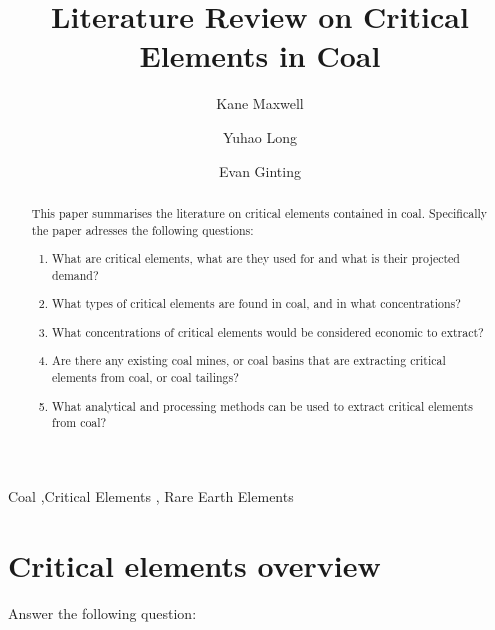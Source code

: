 \documentclass[preprint, 3p,
authoryear]{elsarticle} %
\begin{document}
\begin{frontmatter}

  \title{Literature Review on Critical Elements in Coal}
    \author[Matrix Geoscience]{Kane Maxwell%
  }
    \author[Monash University]{Yuhao Long%
  }
    \author[Monash University]{Evan Ginting%
  }
  
  \begin{abstract}
  This paper summarises the literature on critical elements contained in
  coal. Specifically the paper adresses the following questions:

  \begin{enumerate}
  \def\labelenumi{\arabic{enumi})}
  \item
    What are critical elements, what are they used for and what is their
    projected demand?
  \item
    What types of critical elements are found in coal, and in what
    concentrations?
  \item
    What concentrations of critical elements would be considered
    economic to extract?
  \item
    Are there any existing coal mines, or coal basins that are
    extracting critical elements from coal, or coal tailings?
  \item
    What analytical and processing methods can be used to extract
    critical elements from coal?
  \end{enumerate}
  \end{abstract}
    \begin{keyword}
    Coal \sep Critical Elements \sep 
    Rare Earth Elements
  \end{keyword}
  
 \end{frontmatter}

\hypertarget{critical-elements-overview}{%
\section{Critical elements overview}\label{critical-elements-overview}}

Answer the following question:
\end{document}
